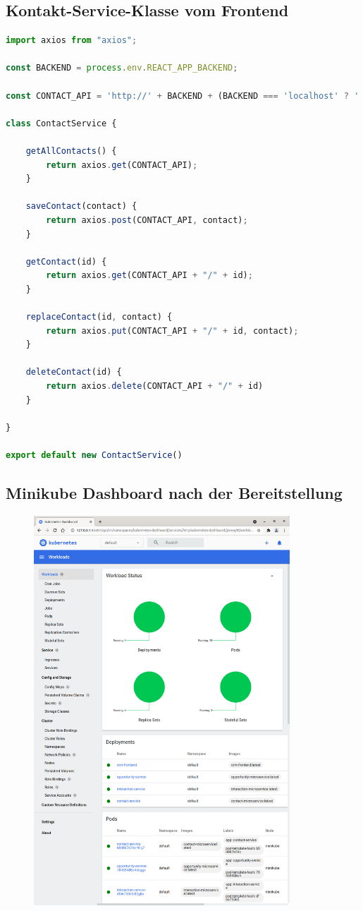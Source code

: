 \subsection*{Kontakt-Service-Klasse vom Frontend}
\begin{lstlisting}[language=JavaScript]
import axios from "axios";

const BACKEND = process.env.REACT_APP_BACKEND;

const CONTACT_API = 'http://' + BACKEND + (BACKEND === 'localhost' ? ':8080' : ':30010') + '/contacts';

class ContactService {

    getAllContacts() {
        return axios.get(CONTACT_API);
    }

    saveContact(contact) {
        return axios.post(CONTACT_API, contact);
    }

    getContact(id) {
        return axios.get(CONTACT_API + "/" + id);
    }

    replaceContact(id, contact) {
        return axios.put(CONTACT_API + "/" + id, contact);
    }

    deleteContact(id) {
        return axios.delete(CONTACT_API + "/" + id)
    }

}

export default new ContactService()
\end{lstlisting}

\clearpage
\subsection*{Minikube Dashboard nach der Bereitstellung}

\begin{figure}[H] 
    \centering
    \includegraphics[width=0.855\textwidth]{figures/MinikubeDashboard.png}
\end{figure}